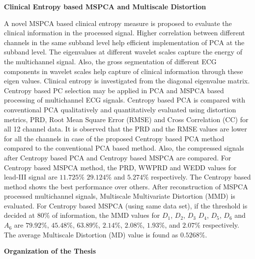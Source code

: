 \vspace{0.3in}
\noindent \textbf{\Large{Clinical Entropy based MSPCA and Multiscale
Distortion}}
\vspace{0.2in}

\noindent A novel MSPCA based clinical entropy measure is proposed
to evaluate the clinical information in the processed signal.
Higher correlation between different channels in the same subband
level help efficient implementation of PCA at the subband level.
The eigenvalues at different wavelet scales capture the energy of
the multichannel signal. Also, the gross segmentation of different
ECG components in wavelet scales help capture of clinical
information through these eigen values. Clinical entropy is
investigated from the diagonal eigenvalue matrix. Centropy based
PC selection may be applied in PCA and MSPCA based processing of
multichannel ECG signals. Centropy based PCA is compared with
conventional PCA qualitatively and quantitatively evaluated using
distortion metrics, PRD, Root Mean Square Error (RMSE) and Cross
Correlation (CC) for all 12 channel data. It is observed that the
PRD and the RMSE values are lower for all the channels in case of
the proposed Centropy based PCA method compared to the
conventional PCA based method. Also, the compressed signals after
Centropy based PCA and Centropy based MSPCA are compared. For
Centropy based MSPCA method, the PRD, WWPRD and WEDD values for
lead-III signal are $11.725\%$ $29.124\%$ and $5.274\%$
respectively. The Centropy based method shows the best performance
over others. After reconstruction of MSPCA processed multichannel
signals, Multiscale Multivariate Distortion (MMD) is evaluated.
For Centropy based MSPCA (using same data set), if the threshold
is decided at 80\% of information, the MMD values for $D_{1}$,
$D_{2}$, $D_{3}$ $D_{4}$, $D_{5}$, $D_{6}$ and $A_{6}$ are
$79.92\%$, $45.48\%$, $63.89\%$, $2.14\%$, $2.08\%$, $1.93\%$, and
$2.07\%$ respectively. The average Multiscale Distortion (MD)
value is found as $0.5268\%$.

\vspace{0.3in}
\noindent \textbf{\Large{Organization of the Thesis}}
\vspace{0.2in}

